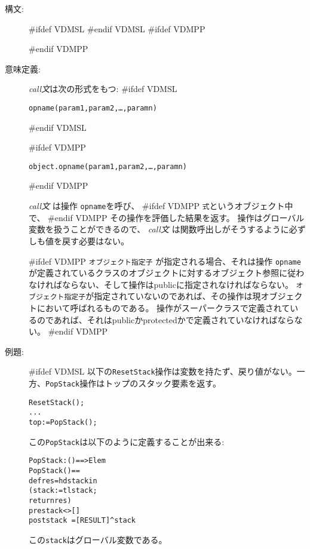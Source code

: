 \documentclass[\pformat,12pt]{jarticle}
\newcommand{\vppsmall}{\small\tt}
\begin{document}
\begin{description}
\item[構文:]
#ifdef VDMSL
#endif VDMSL
#ifdef VDMPP


#endif VDMPP

\item[意味定義:]  {\it call文}は次の形式をもつ:
#ifdef VDMSL
  \begin{alltt}
    opname(param1, param2, \ldots, paramn)
  \end{alltt}
#endif VDMSL

#ifdef VDMPP
  \begin{alltt}
    object.opname(param1, param2, \ldots, paramn)
  \end{alltt}
#endif VDMPP

 {\it call文} は操作 {\tt opname}を呼び、 %
#ifdef VDMPP 
{\tt 式}というオブジェクト中で、
#endif VDMPP
その操作を評価した結果を返す。
操作はグローバル変数を扱うことができるので、 {\it call文} は関数呼出しがそうするように必ずしも値を戻す必要はない。

#ifdef VDMPP 
 {\vppsmall オブジェクト指定子} が指定される場合、それは操作 {\tt opname} が定義されているクラスのオブジェクトに対するオブジェクト参照に従わなければならない、そして操作はpublicに指定されなければならない。
{\tt オブジェクト指定子}が指定されていないのであれば、その操作は現オブジェクトにおいて呼ばれるものである。
操作がスーパークラスで定義されているのであれば、それはpublicかprotectedかで定義されていなければならない。
#endif VDMPP

\item[例題:] \mbox{} 
#ifdef VDMSL
  以下の{\tt ResetStack}操作は変数を持たず、戻り値がない。一方、{\tt PopStack}操作はトップのスタック要素を返す。
  \begin{alltt}
    ResetStack();
    ...
    top := PopStack();
  \end{alltt}
  この{\tt PopStack}は以下のように定義することが出来る:
  \begin{alltt}
    PopStack: () ==> Elem
    PopStack() ==
      def res = hd stack in
       (stack := tl stack;
        return res)
    pre stack <> []
    post stack~ = [RESULT] ^ stack
  \end{alltt}
  この{\tt stack}はグローバル変数である。


\end{description}
\end{document}
